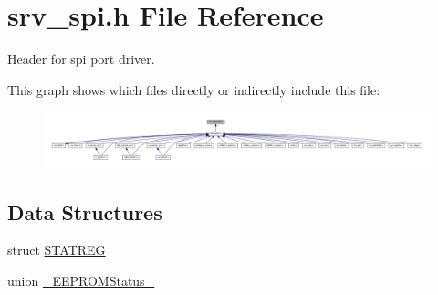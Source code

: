 \hypertarget{a00013}{\section{srv\+\_\+spi.\+h File Reference}
\label{a00013}
}


Header for spi port driver.  


This graph shows which files directly or indirectly include this file\+:\nopagebreak
\begin{figure}[H]
\begin{center}
\leavevmode
\includegraphics[width=350pt]{d9/d49/a01696}
\end{center}
\end{figure}
\subsection*{Data Structures}
\begin{DoxyCompactItemize}
\item 
struct \hyperlink{a00013_d8/d7d/a00789}{S\+T\+A\+T\+R\+E\+G}
\item 
union \hyperlink{a00013_db/df8/a00076}{\+\_\+\+E\+E\+P\+R\+O\+M\+Status\+\_\+}
\end{DoxyCompactItemize}
